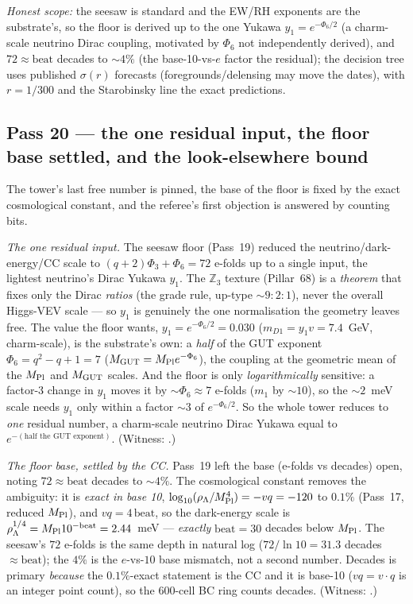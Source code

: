 \documentclass[11pt]{article}
\begin{document}


\emph{Honest scope:} the seesaw is standard and the EW/RH exponents are the substrate's, so the
floor is derived up to the one Yukawa $y_1=e^{-\Phi_6/2}$ (a charm-scale neutrino Dirac
coupling, motivated by $\Phi_6$ not independently derived), and $72\approx\mathrm{beat}$
decades to $\sim4\%$ (the base-10-vs-$e$ factor the residual); the decision tree uses published
$\sigma(r)$ forecasts (foregrounds/delensing may move the dates), with $r=1/300$ and the
Starobinsky line the exact predictions.

\subsection{Pass 20 --- the one residual input, the floor base settled, and the look-elsewhere bound}
\label{sec:capstone-twenty}

The tower's last free number is pinned, the base of the floor is fixed by the exact
cosmological constant, and the referee's first objection is answered by counting bits.

\emph{The one residual input.} The seesaw floor (Pass~19) reduced the neutrino/dark-energy/CC
scale to $(q{+}2)\Phi_3+\Phi_6=72$ e-folds up to a single input, the lightest neutrino's Dirac
Yukawa $y_1$. The $\mathbb{Z}_3$ texture (Pillar~68) is a \emph{theorem} that fixes only the
Dirac \emph{ratios} (the grade rule, up-type $\sim9{:}2{:}1$), never the overall Higgs-VEV
scale --- so $y_1$ is genuinely the one normalisation the geometry leaves free. The value the
floor wants, $y_1=e^{-\Phi_6/2}=0.030$ ($m_{D1}=y_1v=7.4$~GeV, charm-scale), is the substrate's
own: a \emph{half} of the GUT exponent $\Phi_6=q^2{-}q{+}1=7$ ($M_{\rm GUT}=M_{\rm Pl}e^{-\Phi_6}$),
the coupling at the geometric mean of the $M_{\rm Pl}$ and $M_{\rm GUT}$ scales. And the floor is
only \emph{logarithmically} sensitive: a factor-3 change in $y_1$ moves it by $\sim\Phi_6\approx7$
e-folds ($m_1$ by $\sim10$), so the $\sim2$~meV scale needs $y_1$ only within a factor $\sim3$ of
$e^{-\Phi_6/2}$. So the whole tower reduces to \emph{one} residual number, a charm-scale neutrino
Dirac Yukawa equal to $e^{-(\text{half the GUT exponent})}$. (Witness:
.)

\emph{The floor base, settled by the CC.} Pass~19 left the base (e-folds vs decades) open,
noting $72\approx\mathrm{beat}$ decades to $\sim4\%$. The cosmological constant removes the
ambiguity: it is \emph{exact in base 10}, $\log_{10}(\rho_\Lambda/M_{\rm Pl}^4)=-vq=-120$ to
$0.1\%$ (Pass~17, reduced $M_{\rm Pl}$), and $vq=4\,\mathrm{beat}$, so the dark-energy scale is
$\rho_\Lambda^{1/4}=M_{\rm Pl}10^{-\mathrm{beat}}=2.44$~meV --- \emph{exactly} $\mathrm{beat}=30$
decades below $M_{\rm Pl}$. The seesaw's $72$ e-folds is the same depth in natural log
($72/\ln10=31.3$ decades $\approx\mathrm{beat}$); the $4\%$ is the $e$-vs-$10$ base mismatch, not
a second number. Decades is primary \emph{because} the $0.1\%$-exact statement is the CC and it
is base-10 ($vq=v\cdot q$ is an integer point count), so the $600$-cell BC ring counts decades.
(Witness: .)
\end{document}
